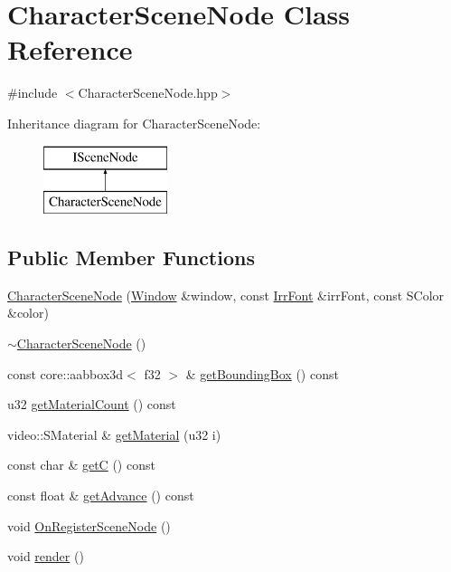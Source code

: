 \hypertarget{class_character_scene_node}{}\section{Character\+Scene\+Node Class Reference}
\label{class_character_scene_node}


{\ttfamily \#include $<$Character\+Scene\+Node.\+hpp$>$}

Inheritance diagram for Character\+Scene\+Node\+:\begin{figure}[H]
\begin{center}
\leavevmode
\includegraphics[height=2.000000cm]{class_character_scene_node}
\end{center}
\end{figure}
\subsection*{Public Member Functions}
\begin{DoxyCompactItemize}
\item 
\mbox{\hyperlink{class_character_scene_node_a6be08f1d27504c67d11a3fd445532c08}{Character\+Scene\+Node}} (\mbox{\hyperlink{class_window}{Window}} \&window, const \mbox{\hyperlink{class_irr_font}{Irr\+Font}} \&irr\+Font, const S\+Color \&color)
\item 
\mbox{\hyperlink{class_character_scene_node_ae2f04e04def6a28057b3f7a3406e655b}{$\sim$\+Character\+Scene\+Node}} ()
\item 
const core\+::aabbox3d$<$ f32 $>$ \& \mbox{\hyperlink{class_character_scene_node_a9657f9d15c4f7aaa955ab5f643e83c73}{get\+Bounding\+Box}} () const
\item 
u32 \mbox{\hyperlink{class_character_scene_node_ae5ad83850c7cca8aed2660267dc09351}{get\+Material\+Count}} () const
\item 
video\+::\+S\+Material \& \mbox{\hyperlink{class_character_scene_node_a148697cb4f3b380425611950d0a78496}{get\+Material}} (u32 i)
\item 
const char \& \mbox{\hyperlink{class_character_scene_node_a3818125c2e3a732b5fea446c10d9ab4d}{getC}} () const
\item 
const float \& \mbox{\hyperlink{class_character_scene_node_a14ea6a810087c669db2abae61c7944b6}{get\+Advance}} () const
\item 
void \mbox{\hyperlink{class_character_scene_node_a6ff117bfc208a8e078dad6b9ec67dc1b}{On\+Register\+Scene\+Node}} ()
\item 
void \mbox{\hyperlink{class_character_scene_node_aa162da6bb2fe0640209d143f876454f7}{render}} ()
\end{DoxyCompactItemize}



